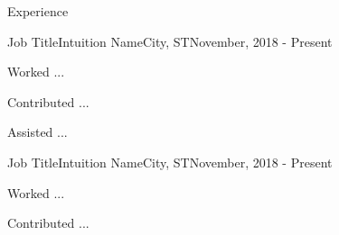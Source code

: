\begin{resume_section}{Experience}
  \begin{resume_employer}{Job Title}{Intuition Name}{City, ST}{November, 2018 - Present}
    \item Worked ...
    \item Contributed ...
    \item Assisted ...
  \end{resume_employer}
  \begin{resume_employer}{Job Title}{Intuition Name}{City, ST}{November, 2018 - Present}
    \item Worked ...
    \item Contributed ...
  \end{resume_employer}
    \vspace{-.5cm}
\end{resume_section}